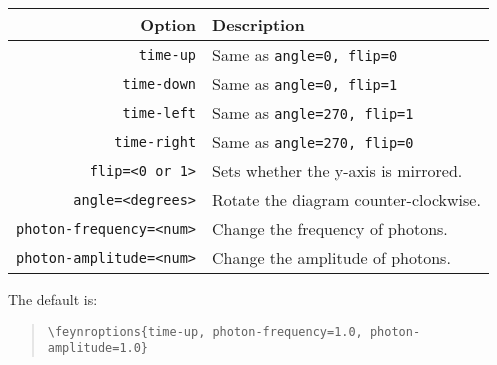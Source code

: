 \documentclass[12pt]{article}
\begin{document}
\begin{center}
\begin{tabular}{r|l}
	Option & Description \\\hline
	\texttt{time-up} & Same as \texttt{angle=0, flip=0} \\
	\texttt{time-down} & Same as \texttt{angle=0, flip=1} \\
	\texttt{time-left} & Same as \texttt{angle=270, flip=1} \\
	\texttt{time-right} & Same as \texttt{angle=270, flip=0} \\
	\texttt{flip=<0 or 1>} & Sets whether the y-axis is mirrored. \\
	\texttt{angle=<degrees>} & Rotate the diagram counter-clockwise. \\
	\texttt{photon-frequency=<num>} & Change the frequency of photons. \\
	\texttt{photon-amplitude=<num>} & Change the amplitude of photons. \\
\end{tabular}
\end{center}
The default is:
\begin{quote}
	\texttt{\textbackslash{}feynroptions\{time-up, photon-frequency=1.0, photon-amplitude=1.0\}}
\end{quote}
\end{document}
